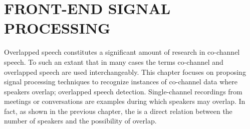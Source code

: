 

\chapter{FRONT-END SIGNAL PROCESSING}

 
Overlapped speech constitutes a significant amount of research in co-channel speech. 
To such an extant that in many cases the terms co-channel and overlapped speech are used interchangeably. 
This chapter focuses on proposing signal processing techniques to recognize instances of co-channel data where speakers overlap; overlapped speech detection. 
Single-channel recordings from meetings or conversations are examples during which speakers may overlap. 
In fact, as shown in the previous chapter, the is a direct relation between the number of speakers and the possibility of overlap. 

